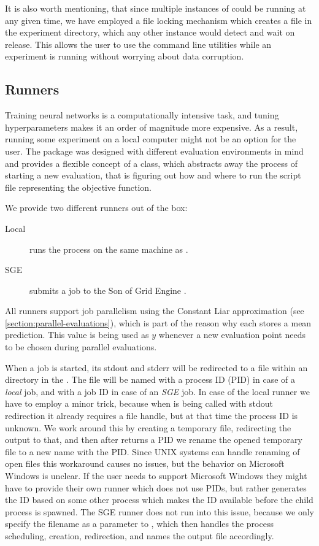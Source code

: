 It is also worth mentioning, that since multiple instances of \bopt could be running at any given time, we have employed a file locking mechanism which creates a  file in the experiment directory, which any other \bopt instance would detect and wait on release. This allows the user to use the command line utilities while an experiment is running without worrying about data corruption.

\subsection{Runners}
\label{section:runners}

Training neural networks is a computationally intensive task, and tuning hyperparameters makes it an order of magnitude more expensive. As a result, running some experiment on a local computer might not be an option for the user. The package was designed with different evaluation environments in mind and provides a flexible concept of a  class, which abstracts away the process of starting a new evaluation, that is figuring out how and where to run the script file representing the objective function.

We provide two different runners out of the box:

\begin{description}
    \item[Local] runs the process on the same machine as \bopt.
    \item[SGE] submits a job to the Son of Grid Engine \citep{sge}.
\end{description}

All runners support job parallelism using the Constant Liar approximation (see \autoref{section:parallel-evaluations}), which is part of the reason why each  stores a mean prediction. This value is being used as $y$ whenever a new evaluation point needs to be chosen during parallel evaluations.

When a job is started, its stdout and stderr will be redirected to a file within an  directory in the . The file will be named with a process ID (PID) in case of a \emph{local} job, and with a job ID in case of an \emph{SGE} job. In case of the local runner we have to employ a minor trick, because when  is being called with stdout redirection it already requires a file handle, but at that time the process ID is unknown. We work around this by creating a temporary file, redirecting the output to that, and then after  returns a PID we rename the opened temporary file to a new name with the PID. Since UNIX systems can handle renaming of open files this workaround causes no issues, but the behavior on Microsoft Windows is unclear. If the user needs to support Microsoft Windows they might have to provide their own runner which does not use PIDs, but rather generates the ID based on some other process which makes the ID available before the child process is spawned. The SGE runner does not run into this issue, because we only specify the filename as a parameter to , which then handles the process scheduling, creation, redirection, and names the output file accordingly.

